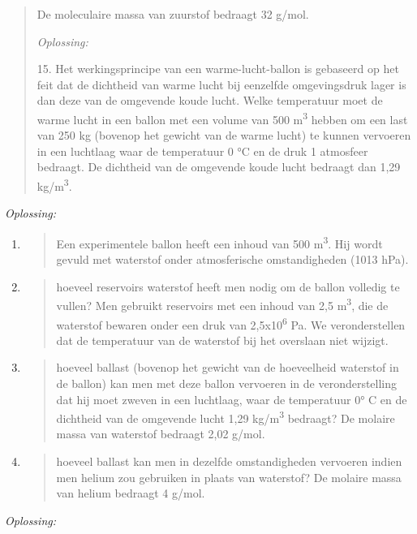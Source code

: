 \documentclass[]{article}
\begin{document}
\begin{quote}
De moleculaire massa van zuurstof bedraagt 32 g/mol.

\emph{Oplossing:}

15. Het werkingsprincipe van een warme-lucht-ballon is gebaseerd op het
feit dat de dichtheid van warme lucht bij eenzelfde omgevingsdruk lager
is dan deze van de omgevende koude lucht. Welke temperatuur moet de
warme lucht in een ballon met een volume van 500 m\textsuperscript{3}
hebben om een last van 250 kg (bovenop het gewicht van de warme lucht)
te kunnen vervoeren in een luchtlaag waar de temperatuur 0 °C en de druk
1 atmosfeer bedraagt. De dichtheid van de omgevende koude lucht bedraagt
dan 1,29 kg/m\textsuperscript{3}.
\end{quote}

\emph{Oplossing:}

\begin{enumerate}
\def\labelenumi{\arabic{enumi}.}
\setcounter{enumi}{15}
\item
  \begin{quote}
  Een experimentele ballon heeft een inhoud van 500
  m\textsuperscript{3}. Hij wordt gevuld met waterstof onder
  atmosferische omstandigheden (1013 hPa).
  \end{quote}
\item
  \begin{quote}
  hoeveel reservoirs waterstof heeft men nodig om de ballon volledig te
  vullen? Men gebruikt reservoirs met een inhoud van 2,5
  m\textsuperscript{3}, die de waterstof bewaren onder een druk van
  2,5x10\textsuperscript{6} Pa. We veronderstellen dat de temperatuur
  van de waterstof bij het overslaan niet wijzigt.
  \end{quote}
\item
  \begin{quote}
  hoeveel ballast (bovenop het gewicht van de hoeveelheid waterstof in
  de ballon) kan men met deze ballon vervoeren in de veronderstelling
  dat hij moet zweven in een luchtlaag, waar de temperatuur 0° C en de
  dichtheid van de omgevende lucht 1,29 kg/m\textsuperscript{3}
  bedraagt? De molaire massa van waterstof bedraagt 2,02 g/mol.
  \end{quote}
\item
  \begin{quote}
  hoeveel ballast kan men in dezelfde omstandigheden vervoeren indien
  men helium zou gebruiken in plaats van waterstof? De molaire massa van
  helium bedraagt 4 g/mol.
  \end{quote}
\end{enumerate}

\emph{Oplossing:}
\end{document}

